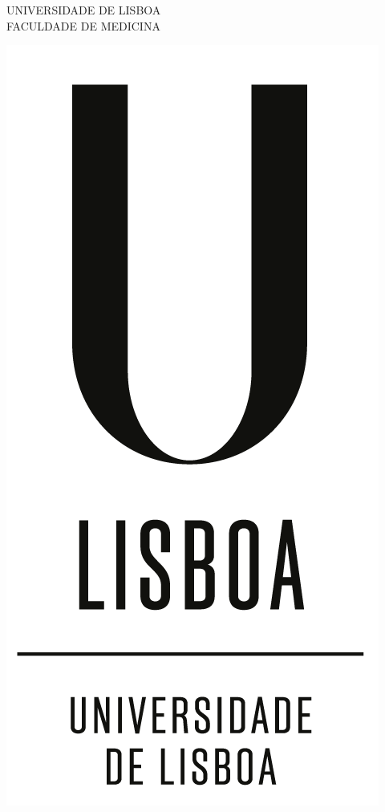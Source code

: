 \begin{titlepage}
    \begin{center}
        UNIVERSIDADE DE LISBOA\\
        FACULDADE DE MEDICINA
        
        \vspace{0cm}
        
        {\includegraphics[scale=0.5]{figures/cover/UL-VerticalPositivo.png}}
        

\end{center}
\end{titlepage}
